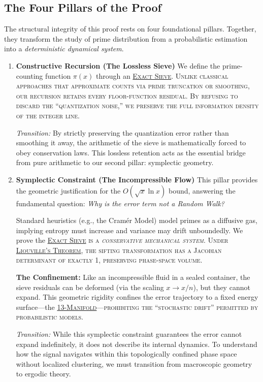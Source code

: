 \documentclass[sn-mathphys-num, pdflatex]{sn-jnl}
\newcommand{\gterm}[2]{\begingroup\normalfont\scshape\hyperlink{#1}{#2}\endgroup}
\begin{document}
\subsection{The Four Pillars of the Proof}
The structural integrity of this proof rests on four foundational pillars. Together, they transform the study of prime distribution from a probabilistic estimation into a \textit{deterministic dynamical system}.

\begin{enumerate}
    \item \textbf{Constructive Recursion (The Lossless Sieve)}
    We define the prime-counting function $\pi(x)$ through an \gterm{exact_sieve}{Exact Sieve}. Unlike classical approaches that approximate counts via prime truncation or smoothing, our recursion retains every floor-function residual. By refusing to discard the ``quantization noise,'' we preserve the full information density of the integer line.
  
    \noindent\textit{Transition:} By strictly preserving the quantization error rather than smoothing it away, the arithmetic of the sieve is mathematically forced to obey conservation laws. This lossless retention acts as the essential bridge from pure arithmetic to our second pillar: symplectic geometry.
    
    \item \textbf{Symplectic Constraint (The Incompressible Flow)}
    This pillar provides the geometric justification for the $O(\sqrt{x}\ln x)$ bound, answering the fundamental question: \textit{Why is the error term not a Random Walk?}
    
    Standard heuristics (e.g., the Cramér Model) model primes as a diffusive gas, implying entropy must increase and variance may drift unboundedly. We prove the \gterm{exact_sieve}{Exact Sieve} is a \textit{conservative mechanical system}. Under \gterm{liouville}{Liouville's Theorem}, the sifting transformation has a Jacobian determinant of exactly 1, preserving phase-space volume.     
        
    \textbf{The Confinement:} Like an incompressible fluid in a sealed container, the sieve residuals can be deformed (via the scaling $x \to x/n$), but they cannot expand. This geometric rigidity confines the error trajectory to a fixed energy surface---the \gterm{m13}{13-Manifold}---prohibiting the ``stochastic drift'' permitted by probabilistic models.
   
    \noindent\textit{Transition:} While this symplectic constraint guarantees the error cannot expand indefinitely, it does not describe its internal dynamics. To understand how the signal navigates within this topologically confined phase space without localized clustering, we must transition from macroscopic geometry to ergodic theory.
    

\end{enumerate}
\end{document}
